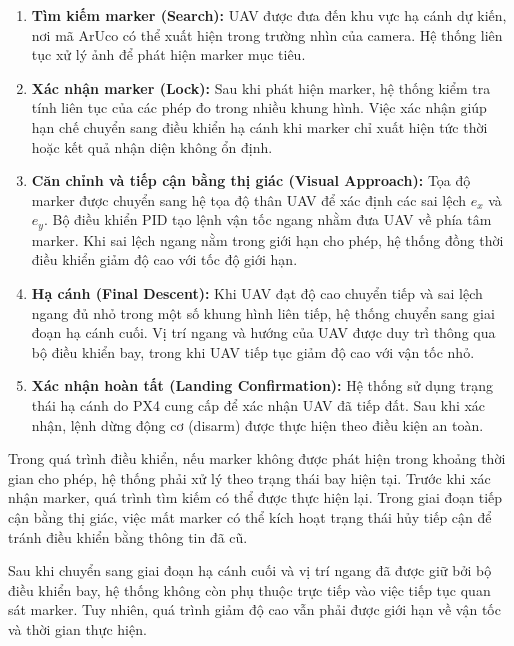 \begin{enumerate}
    \item \textbf{Tìm kiếm marker (Search):}
    UAV được đưa đến khu vực hạ cánh dự kiến,
    nơi mã ArUco có thể xuất hiện trong
    trường nhìn của camera. Hệ thống liên
    tục xử lý ảnh để phát hiện marker mục tiêu.

    \item \textbf{Xác nhận marker (Lock):}
    Sau khi phát hiện marker, hệ thống kiểm
    tra tính liên tục của các phép đo trong
    nhiều khung hình. Việc xác nhận giúp
    hạn chế chuyển sang điều khiển hạ cánh
    khi marker chỉ xuất hiện tức thời hoặc
    kết quả nhận diện không ổn định.

    \item \textbf{Căn chỉnh và tiếp cận
    bằng thị giác (Visual Approach):}
    Tọa độ marker được chuyển sang hệ
    tọa độ thân UAV để xác định các sai
    lệch $e_x$ và $e_y$. Bộ điều khiển
    PID tạo lệnh vận tốc ngang nhằm đưa
    UAV về phía tâm marker. Khi sai lệch
    ngang nằm trong giới hạn cho phép,
    hệ thống đồng thời điều khiển giảm
    độ cao với tốc độ giới hạn.

    \item \textbf{Hạ cánh (Final Descent):}
    Khi UAV đạt độ cao chuyển tiếp và
    sai lệch ngang đủ nhỏ trong một số
    khung hình liên tiếp, hệ thống chuyển
    sang giai đoạn hạ cánh cuối. Vị trí
    ngang và hướng của UAV được duy trì
    thông qua bộ điều khiển bay, trong
    khi UAV tiếp tục giảm độ cao với
    vận tốc nhỏ.

    \item \textbf{Xác nhận hoàn tất
    (Landing Confirmation):}
    Hệ thống sử dụng trạng thái hạ cánh
    do PX4 cung cấp để xác nhận UAV đã
    tiếp đất. Sau khi xác nhận, lệnh
    dừng động cơ (disarm) được thực hiện
    theo điều kiện an toàn.
\end{enumerate}

Trong quá trình điều khiển, nếu marker
không được phát hiện trong khoảng thời gian
cho phép, hệ thống phải xử lý theo trạng
thái bay hiện tại. Trước khi xác nhận
marker, quá trình tìm kiếm có thể được
thực hiện lại. Trong giai đoạn tiếp cận
bằng thị giác, việc mất marker có thể
kích hoạt trạng thái hủy tiếp cận để
tránh điều khiển bằng thông tin đã cũ.

Sau khi chuyển sang giai đoạn hạ cánh
cuối và vị trí ngang đã được giữ bởi
bộ điều khiển bay, hệ thống không còn
phụ thuộc trực tiếp vào việc tiếp tục
quan sát marker. Tuy nhiên, quá trình
giảm độ cao vẫn phải được giới hạn
về vận tốc và thời gian thực hiện.

